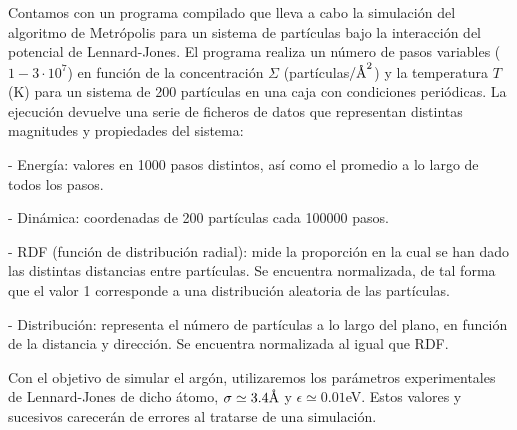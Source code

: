 Contamos con un programa compilado que lleva a cabo la simulación del algoritmo de Metrópolis para un sistema de partículas bajo la interacción del potencial de Lennard-Jones. El programa realiza un número de pasos variables ($1-3 \cdot 10^{7}$) en función de la concentración $\Sigma$ (partículas$/\textup{\r{A}}^2$) y la temperatura $T$ (K) para un sistema de 200 partículas en una caja con condiciones periódicas. La ejecución devuelve una serie de ficheros de datos que representan distintas magnitudes y propiedades del sistema:

- Energía: valores en 1000 pasos distintos, así como el promedio a lo largo de todos los pasos.

- Dinámica: coordenadas de 200 partículas cada 100000 pasos.

- RDF (función de distribución radial): mide la proporción en la cual se han dado las distintas distancias entre partículas. Se encuentra normalizada, de tal forma que el valor 1 corresponde a una distribución aleatoria de las partículas. 

- Distribución: representa el número de partículas a lo largo del plano, en función de la distancia y dirección. Se encuentra normalizada al igual que RDF.

Con el objetivo de simular el argón, utilizaremos los parámetros experimentales de Lennard-Jones de dicho átomo, $\sigma \simeq 3.4 \textup{\r{A}}$ y $\epsilon \simeq 0.01$eV. Estos valores y sucesivos carecerán de errores al tratarse de una simulación.